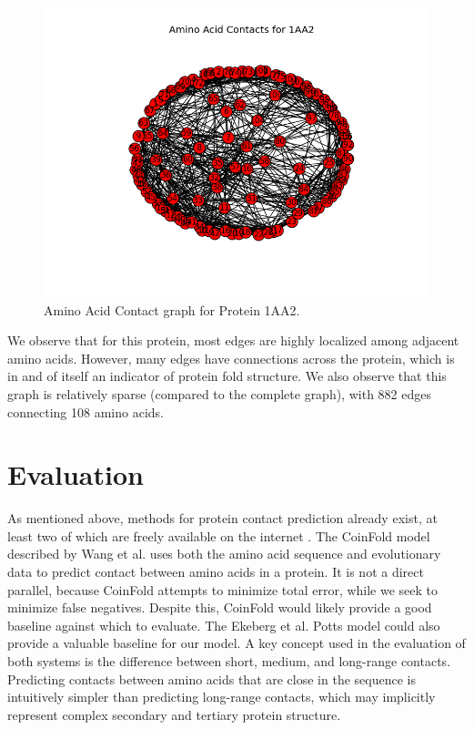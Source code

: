\documentclass{article}
\begin{document}
\begin{figure}
\centering
\includegraphics[scale=0.3]{1aa2_plot.png}
\caption{Amino Acid Contact graph for Protein 1AA2.}
\label{fig:contactgraph}
\end{figure}
 
We observe that for this protein, most edges are highly localized among adjacent amino acids. However, many edges have connections across the protein, which is in and of itself an indicator of protein fold structure. We also observe that this graph is relatively sparse (compared to the complete graph), with 882 edges connecting 108 amino acids. 


\section{Evaluation}
As mentioned above, methods for protein contact prediction already exist, at least two of which are freely available on the internet\cite{ekeberg13} \cite{wang16}. The CoinFold model described by Wang et al. uses both the amino acid sequence and evolutionary data to predict contact between amino acids in a protein. It is not a direct parallel, because CoinFold attempts to minimize total error, while we seek to minimize false negatives. Despite this, CoinFold would likely provide a good baseline against which to evaluate. The Ekeberg et al. \cite{ekeberg13} Potts model could also provide a valuable baseline for our model. A key concept used in the evaluation of both systems is the difference between short, medium, and long-range contacts. Predicting contacts between amino acids that are close in the sequence is intuitively simpler than predicting long-range contacts, which may implicitly represent complex secondary and tertiary protein structure. 
\end{document}
